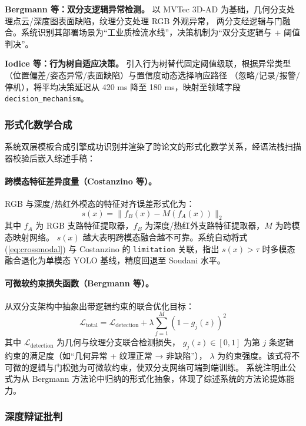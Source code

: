 \documentclass[a4paper,11pt]{article}
\begin{document}
\noindent\textbf{Bergmann 等：双分支逻辑异常检测。}
以 MVTec 3D-AD 为基础，几何分支处理点云/深度图表面缺陷，纹理分支处理 RGB 外观异常，
两分支经逻辑与门融合。系统识别其部署场景为``工业质检流水线''，决策机制为``双分支逻辑与 + 阈值判决''。

\noindent\textbf{Iodice 等：行为树自适应决策。}
引入行为树替代固定阈值级联，根据异常类型（位置偏差/姿态异常/表面缺陷）与置信度动态选择响应路径
（忽略/记录/报警/停机），将平均决策延迟从 420 ms 降至 180 ms，映射至领域字段 \texttt{decision\_mechanism}。

\subsubsection{形式化数学合成}

系统双层模板合成引擎成功识别并渲染了跨论文的形式化数学关系，经语法栈扫描器校验后嵌入综述手稿：

\paragraph{跨模态特征差异度量（Costanzino 等）。}
RGB 与深度/热红外模态的特征对齐误差形式化为：
\begin{equation}
s(x) = \|f_B(x) - M(f_A(x))\|_2
\label{eq:crossmodal}
\end{equation}
其中 $f_A$ 为 RGB 支路特征提取器，$f_B$ 为深度/热红外支路特征提取器，$M$ 为跨模态映射网络。
$s(x)$ 越大表明跨模态融合越不可靠。系统自动将式 (\ref{eq:crossmodal}) 与 Costanzino 的 \texttt{limitation}
关联，指出 $s(x) > \tau$ 时多模态融合退化为单模态 YOLO 基线，精度回退至 Soudani 水平。

\paragraph{可微软约束损失函数（Bergmann 等）。}
从双分支架构中抽象出带逻辑约束的联合优化目标：
\begin{equation}
\mathcal{L}_{\text{total}} = \mathcal{L}_{\text{detection}} + \lambda \sum_{j=1}^{M} (1 - g_j(z))^2
\label{eq:softconstraint}
\end{equation}
其中 $\mathcal{L}_{\text{detection}}$ 为几何与纹理分支联合检测损失，
$g_j(z) \in [0,1]$ 为第 $j$ 条逻辑约束的满足度（如``几何异常 + 纹理正常 → 非缺陷''），
$\lambda$ 为约束强度。该式将不可微的逻辑与门松弛为可微软约束，使双分支网络可端到端训练。
系统注明此公式为从 Bergmann 方法论中归纳的形式化抽象，体现了综述系统的方法论提炼能力。

\subsubsection{深度辩证批判}
\end{document}

